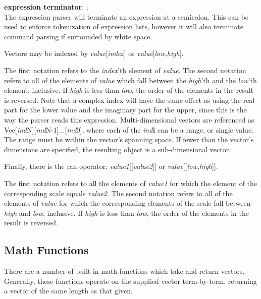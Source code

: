 \begin{description}
\item{\bf expression terminator}: {\vt ;}\\
The expression parser will terminate an expression at a semicolon. 
This can be used to enforce tokenization of expression lists, however
it will also terminate command parsing if surrounded by white space.
\end{description}

Vectors may be indexed by {\it value\/}[{\it index\/}] or {\it
value\/}[{\it low,high\/}].

The first notation refers to the {\it index\/}'th element of {\it
value}.  The second notation refers to all of the elements of {\it
value} which fall between the {\it high\/}'th and the {\it low\/}'th
element, inclusive.  If {\it high} is less than {\it low}, the order
of the elements in the result is reversed.  Note that a complex index
will have the same effect as using the real part for the lower value
and the imaginary part for the upper, since this is the way the parser
reads this expression.  Multi-dimensional vectors are referenced as
Vec[{\it ind\/}N][{\it ind\/}N-1]...[{\it ind\/}0], where each of the
{\it ind\/}I can be a range, or single value.  The range must be
within the vector's spanning space.  If fewer than the vector's
dimensions are specified, the resulting object is a sub-dimensional
vector.

Finally, there is the ran operator:  {\it value1\/}[[{\it value2\/}]]
or {\it value\/}[[{\it low,high\/}]].

The first notation refers to all the elements of {\it value1} for
which the element of the corresponding scale equals {\it value2}.  The
second notation refers to all of the elements of {\it value} for which
the corresponding elements of the scale fall between {\it high} and
{\it low}, inclusive.  If {\it high} is less than {\it low}, the order
of the elements in the result is reversed.

\subsection{Math Functions}


There are a number of built-in math functions which take and return
vectors.  Generally, these functions operate on the supplied vector
term-by-term, returning a vector of the same length as that given.

